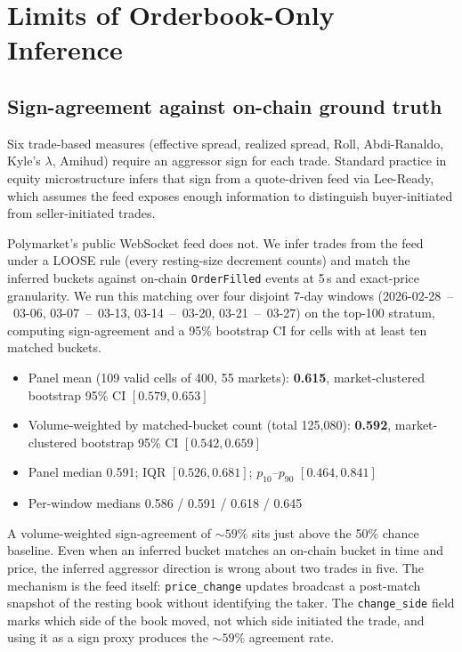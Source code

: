 \documentclass[11pt,a4paper,twocolumn]{article}
\begin{document}
\section{Limits of Orderbook-Only Inference}\label{sec:limits}

\subsection{Sign-agreement against on-chain ground truth}\label{ssec:sign-agreement}

Six trade-based measures (effective spread, realized spread, Roll,
Abdi-Ranaldo, Kyle's $\lambda$, Amihud) require an aggressor sign for
each trade. Standard practice in equity microstructure infers that
sign from a quote-driven feed via Lee-Ready, which assumes the feed
exposes enough information to distinguish buyer-initiated from
seller-initiated trades.

Polymarket's public WebSocket feed does not. We infer trades from
the feed under a LOOSE rule (every resting-size decrement counts) and
match the inferred buckets against on-chain \texttt{OrderFilled}
events at 5\,s and exact-price granularity. We run this matching over
four disjoint 7-day windows (2026-02-28~--~03-06, 03-07~--~03-13,
03-14~--~03-20, 03-21~--~03-27) on the top-100 stratum, computing
sign-agreement and a 95\% bootstrap CI for cells with at least ten
matched buckets.

\begin{itemize}
  \item Panel mean (109 valid cells of 400, 55 markets):
        \textbf{0.615}, market-clustered bootstrap 95\% CI
        $[0.579, 0.653]$
  \item Volume-weighted by matched-bucket count
        (total 125{,}080): \textbf{0.592}, market-clustered
        bootstrap 95\% CI $[0.542, 0.659]$
  \item Panel median 0.591; IQR $[0.526, 0.681]$;
        $p_{10}$--$p_{90}$ $[0.464, 0.841]$
  \item Per-window medians 0.586 / 0.591 / 0.618 / 0.645
\end{itemize}

A volume-weighted sign-agreement of $\sim 59\%$ sits just above the
50\% chance baseline. Even when an inferred bucket matches an
on-chain bucket in time and price, the inferred aggressor direction
is wrong about two trades in five. The mechanism is the feed itself:
\texttt{price\_change} updates broadcast a post-match snapshot of the
resting book without identifying the taker. The \texttt{change\_side}
field marks which side of the book moved, not which side initiated
the trade, and using it as a sign proxy produces the $\sim 59\%$
agreement rate.
\end{document}
